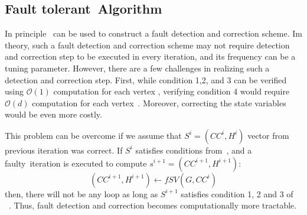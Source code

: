 \begin{comment}
\begin{thm}
\label{thm:strong-SV-converg-cond}
Given a graph $G=(V,E)$ and a arbitrary state vector $S=(CC,H)$, the~\refalg{alg:SV_ALG} starting from $S$ will converge to correct solution defined by [insert ref to definition], if $S$ satisfies following condition:
%
\begin{enumerate*}
\item Parent of any vertex $v$ is either $v$ itself or it is one of neighbor: $H(v) \in \{ v, E(v)\}$;

\item if $H(v)=v$, then $CC(v)=v$;

\item $CC[v]\leq v$;

\item $CC[v]\geq CC[H[v]] $ ;and

\item There are no loop except self-loops in the directed graph $G^{*}$ defined by $G^{*} = (V,E^{*})$,
 where $E^{*}=\{ (v,H(v)) \forall v \in V \}$ .
\end{enumerate*}
\end{thm}
\end{comment}



\subsection{Fault tolerant~\sv Algorithm}
In principle~ can be used to construct a fault detection and correction scheme. 
Im theory,  such a fault detection and correction scheme may not require detection and correction 
step to be executed in every iteration, and its frequency can be a tuning parameter. 
However, there are a few challenges in realizing such a detection and correction step. 
First, while condition 1,2, and 3 can be verified using $\mathcal{O}(1)$ computation for each vertex , verifying
condition 4 would require $\mathcal{O}(d)$ computation for each vertex~\cite{brent1980cycle}. 
Moreover, correcting the state variables would be even more costly. 

This problem can be overcome if we assume that $S^{i}=(CC^{i},H^{i})$ vector from previous iteration was correct.
If $S^{i}$ satisfies conditions from~, and a faulty~\sv iteration
is executed to compute $s^{i+1} = (CC^{i+1},H^{i+1})$:
\[
(CC^{i+1},H^{i+1}) \leftarrow fSV (G,CC^{i}) 
\] 
then, there will not be any loop as long as $S^{i+1}$ satisfies condition 1, 2 and 3 of ~. Thus, fault detection and correction becomes computationally more tractable.

